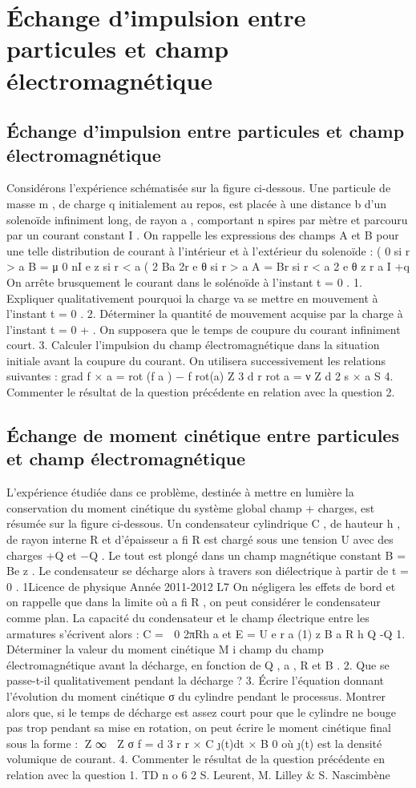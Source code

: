 
\section{Échange d'impulsion entre particules et champ électromagnétique}
\subsection{Échange d'impulsion entre particules et champ électromagnétique}%
Considérons l'expérience schématisée sur la figure ci-dessous. Une particule de masse m , de charge q initialement au repos, est placée à une
distance b d'un solenoïde infiniment long, de rayon a , comportant n spires
par mètre et parcouru par un courant constant I .
On rappelle les expressions des champs A et B pour une telle distribution
de courant à l'intérieur et à l'extérieur du solenoïde :
(
0
si r > a
B =
μ 0 nI e z si r < a
( 2
Ba
2r e θ si r > a
A =
Br
si r < a
2 e θ
z
r
a
I
+q
On arrête brusquement le courant dans le solénoïde à l'instant t = 0 .
1. Expliquer qualitativement pourquoi la charge va se mettre en mouvement à l'instant t = 0 .
2. Déterminer la quantité de mouvement acquise par la charge à l'instant t = 0 + . On supposera
que le temps de coupure du courant infiniment court.
3. Calculer l'impulsion du champ électromagnétique dans la situation initiale avant la coupure
du courant. On utilisera successivement les relations suivantes :
grad f × a = rot (f a ) − f rot(a)
Z
3
d r rot a =
ν
Z
d 2 s × a
S
4. Commenter le résultat de la question précédente en relation avec la question 2.
\subsection{Échange de moment cinétique entre particules et champ électromagnétique}%
L'expérience étudiée dans ce problème, destinée à mettre en lumière la conservation du moment cinétique du système global champ + charges, est résumée sur la figure ci-dessous. Un
condensateur cylindrique C , de hauteur h , de rayon interne R et d'épaisseur a fi R est chargé
sous une tension U avec des charges +Q et −Q . Le tout est plongé dans un champ magnétique
constant B = Be z . Le condensateur se décharge alors à travers son diélectrique à partir de t = 0 .
1Licence de physique
Année 2011-2012
L7
On négligera les effets de bord et on rappelle que dans la limite où a fi R , on peut considérer le condensateur comme plan. La capacité du condensateur et le champ électrique entre les
armatures s'écrivent alors :
C =  0
2πRh
a
et E =
U
e r
a
(1)
z
B
a
R
h
Q
-Q
1. Déterminer la valeur du moment cinétique M i champ du champ électromagnétique avant la
décharge, en fonction de Q , a , R et B .
2. Que se passe-t-il qualitativement pendant la décharge ?
3. Écrire l'équation donnant l'évolution du moment cinétique σ du cylindre pendant le processus. Montrer alors que, si le temps de décharge est assez court pour que le cylindre ne
bouge pas trop pendant sa mise en rotation, on peut écrire le moment cinétique final sous
la forme :
Z ∞

Z
σ f =
d 3 r r ×
C
(t)dt × B
0
où (t) est la densité volumique de courant.
4. Commenter le résultat de la question précédente en relation avec la question 1.
TD n o 6
2
S. Leurent, M. Lilley & S. Nascimbène
